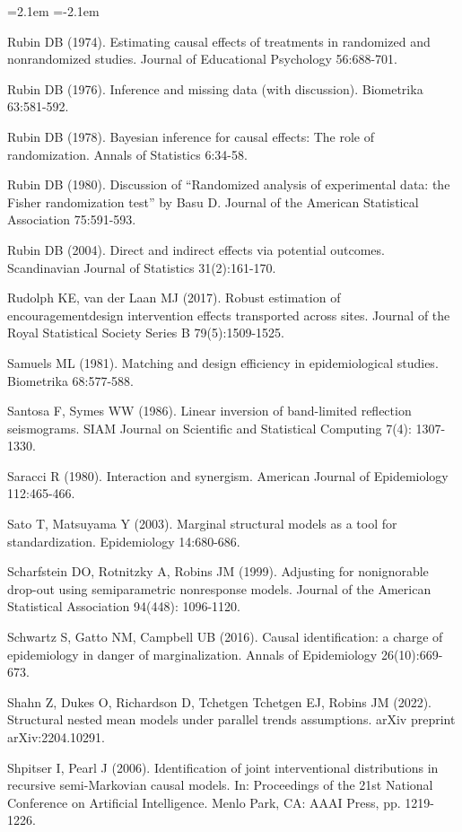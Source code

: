 \begin{list}{}{\leftmargin=2.1em   \itemindent=-2.1em \parsep=0pt \itemsep=1.6pt \topsep=4pt \rightmargin=0pt}
\item Rubin DB (1974). Estimating causal effects of treatments in randomized and nonrandomized studies. Journal of Educational Psychology 56:688-701.
\item Rubin DB (1976). Inference and missing data (with discussion). Biometrika 63:581-592.
\item Rubin DB (1978). Bayesian inference for causal effects: The role of randomization. Annals of Statistics 6:34-58.
\item Rubin DB (1980). Discussion of ``Randomized analysis of experimental data: the Fisher randomization test'' by Basu D. Journal of the American Statistical Association 75:591-593.
\item Rubin DB (2004). Direct and indirect effects via potential outcomes. Scandinavian Journal of Statistics 31(2):161-170.
\item Rudolph KE, van der Laan MJ (2017). Robust estimation of encouragementdesign intervention effects transported across sites. Journal of the Royal Statistical Society Series B 79(5):1509-1525.
\item Samuels ML (1981). Matching and design efficiency in epidemiological studies. Biometrika 68:577-588.
\item Santosa F, Symes WW (1986). Linear inversion of band-limited reflection seismograms. SIAM Journal on Scientific and Statistical Computing 7(4): 1307-1330.
\item Saracci R (1980). Interaction and synergism. American Journal of Epidemiology 112:465-466.
\item Sato T, Matsuyama Y (2003). Marginal structural models as a tool for standardization. Epidemiology 14:680-686.
\item Scharfstein DO, Rotnitzky A, Robins JM (1999). Adjusting for nonignorable drop-out using semiparametric nonresponse models. Journal of the American Statistical Association 94(448): 1096-1120.
\item Schwartz S, Gatto NM, Campbell UB (2016). Causal identification: a charge of epidemiology in danger of marginalization. Annals of Epidemiology 26(10):669-673.
\item Shahn Z, Dukes O, Richardson D, Tchetgen Tchetgen EJ, Robins JM (2022). Structural nested mean models under parallel trends assumptions. arXiv preprint arXiv:2204.10291.
\item Shpitser I, Pearl J (2006). Identification of joint interventional distributions in recursive semi-Markovian causal models. In: Proceedings of the 21st National Conference on Artificial Intelligence. Menlo Park, CA: AAAI Press, pp. 1219-1226.

\end{list}
